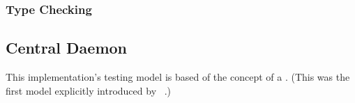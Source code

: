 \subsubsection{Type Checking}
\label{sec:logic-repr:self-stab-algor:type-checking}



\subsection{Central Daemon}
\label{sec:logic-repr:daemon}

This implementation's testing model is based of the concept of a .
(This was the first model explicitly introduced by \citeauthor{Dijkstra:1974:SSS:361179.361202}~\autocite{Dijkstra:1974:SSS:361179.361202}.)

